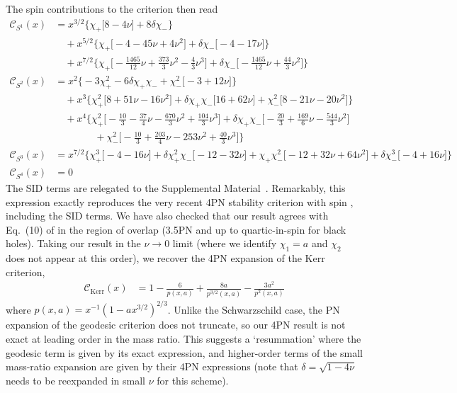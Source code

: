 \documentclass[prd,superscriptaddress,preprintnumbers,tightenlines,nofootinbib, eqsecnum]{revtex4-2}
\newcommand{\nn}{\nonumber}
\begin{document}
The spin contributions to the criterion then read
\begin{subequations}
\begin{align}
\mathcal{C}_{S^1}(x) &= x^{3/2}\Bigg\{\chi_{+}\Bigg[8 - 4 \nu\Bigg] + 8 \delta\chi_{-}\Bigg\} \nn \\
&\quad + x^{5/2}\Bigg\{\chi_{+}\Bigg[-4 - 45 \nu + 4 \nu^{2}\Bigg] + \delta\chi_{-}\Bigg[-4 - 17 \nu\Bigg]\Bigg\} \nn \\
&\quad + x^{7/2}\Bigg\{\chi_{+}\Bigg[-\frac{1465}{12} \nu + \frac{373}{3} \nu^{2} - \frac{4}{3} \nu^{3}\Bigg] + \delta\chi_{-}\Bigg[-\frac{1465}{12} \nu + \frac{44}{3} \nu^{2}\Bigg]\Bigg\} \\
\mathcal{C}_{S^2}(x) &= x^{2}\Bigg\{-3\chi_{+}^2 - 6 \delta\chi_{+}\chi_{-} + \chi_{-}^2\Bigg[-3 + 12 \nu\Bigg]\Bigg\} \nn \\
&\quad + x^{3}\Bigg\{\chi_{+}^2\Bigg[8 + 51 \nu - 16 \nu^{2}\Bigg] + \delta\chi_{+}\chi_{-}\Bigg[16 + 62 \nu\Bigg] + \chi_{-}^2\Bigg[8 - 21 \nu - 20 \nu^{2}\Bigg]\Bigg\} \nn \\
&\quad + x^{4}\Bigg\{\chi_{+}^2\Bigg[-\frac{10}{3} - \frac{37}{4} \nu - \frac{670}{3} \nu^{2} + \frac{104}{3} \nu^{3}\Bigg] + \delta\chi_{+}\chi_{-}\Bigg[-\frac{20}{3} + \frac{169}{6} \nu - \frac{544}{3} \nu^{2}\Bigg] \nn\\
&\qquad\qquad + \chi_{-}^2\Bigg[-\frac{10}{3} + \frac{203}{4} \nu - 253 \nu^{2} + \frac{40}{3} \nu^{3}\Bigg]\Bigg\} \\
\mathcal{C}_{S^3}(x) &= x^{7/2}\Bigg\{\chi_{+}^3\Bigg[-4 - 16 \nu\Bigg] + \delta\chi_{+}^2\chi_{-}\Bigg[-12 - 32 \nu\Bigg] + \chi_{+}\chi_{-}^2\Bigg[-12 + 32 \nu + 64 \nu^{2}\Bigg]  + \delta\chi_{-}^3\Bigg[-4 + 16 \nu\Bigg]\Bigg\} \\
\mathcal{C}_{S^4}(x) &= 0
\end{align}
\end{subequations}
The SID terms are relegated to the Supplemental Material~\cite{Supplemental}.
Remarkably, this expression exactly reproduces the very recent 4PN  stability criterion with spin \cite{Blanchet:2026wwa}, including the SID terms. We have also checked that our result agrees with  Eq.~(10) of \cite{LeTiec:2013uey} in the region of overlap (3.5PN and up to quartic-in-spin for black holes).
Taking our result in the $\nu \rightarrow 0$ limit (where we identify $\chi_1=a$ and $\chi_2$ does not appear at this order), we recover the 4PN expansion of the Kerr criterion,
\begin{align}
    \mathcal{C}_\text{Kerr}(x) &= 1-\frac{6}{p(x,a)} + \frac{8 a}{p^{3/2}(x,a)}- \frac{3a^2}{p^2(x,a)}
\end{align}
where $p(x,a) = x^{-1}(1-a x^{3/2})^{2/3} $. Unlike the Schwarzschild case, the PN expansion of the geodesic criterion does not truncate, so our 4PN result is not exact at leading order in the mass ratio. This suggests a `resummation' where the geodesic term is given by its exact expression, and higher-order terms of the small mass-ratio expansion are given by their 4PN expressions (note that $\delta=\sqrt{1-4\nu}$ needs to be reexpanded in small $\nu$ for this scheme).
\end{document}
